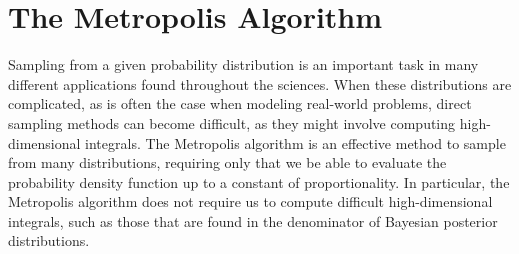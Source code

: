 
\section*{The Metropolis Algorithm}
Sampling from a given probability distribution is an important task in many different applications found throughout the sciences.
When these distributions are complicated, as is often the case when modeling real-world problems, direct sampling methods
can become difficult, as they might involve computing high-dimensional integrals.
The Metropolis algorithm is an effective method to sample from many distributions, requiring only that we
be able to evaluate the probability density function up to a constant of proportionality. In particular,
the Metropolis algorithm does not require us to compute difficult high-dimensional integrals, such as those that are found
in the denominator of Bayesian posterior distributions.

